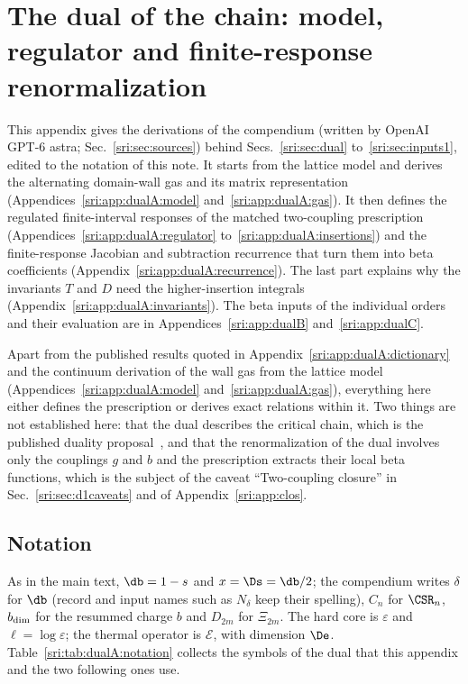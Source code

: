 \section{The dual of the chain: model, regulator and finite-response renormalization}\label{sri:app:dualA}
This appendix gives the derivations of the compendium (written by OpenAI GPT-6 astra; Sec.~\ref{sri:sec:sources})
behind Secs.~\ref{sri:sec:dual} to~\ref{sri:sec:inputs1}, edited to the notation of this note. It starts from the lattice
model and derives the alternating domain-wall gas and its matrix representation
(Appendices~\ref{sri:app:dualA:model} and~\ref{sri:app:dualA:gas}). It then defines the regulated finite-interval responses
of the matched two-coupling prescription (Appendices~\ref{sri:app:dualA:regulator} to~\ref{sri:app:dualA:insertions}) and
the finite-response Jacobian and subtraction recurrence that turn them into beta coefficients
(Appendix~\ref{sri:app:dualA:recurrence}). The last part explains why the invariants $T$ and $D$ need the
higher-insertion integrals (Appendix~\ref{sri:app:dualA:invariants}). The beta inputs of the individual orders and their
evaluation are in Appendices~\ref{sri:app:dualB} and~\ref{sri:app:dualC}.

Apart from the published results quoted in Appendix~\ref{sri:app:dualA:dictionary} and the continuum derivation of the
wall gas from the lattice model (Appendices~\ref{sri:app:dualA:model} and~\ref{sri:app:dualA:gas}), everything here either
defines the prescription or derives exact relations within it. Two things are not established here: that the dual
describes the critical chain, which is the published duality proposal~\cite{sri:Benedetti:2024wgx,sri:Benedetti:2025nzp}, and
that the renormalization of the dual involves only the couplings $g$ and $b$ and the prescription extracts their local
beta functions, which is the subject of the caveat ``Two-coupling closure'' in Sec.~\ref{sri:sec:d1caveats} and of
Appendix~\ref{sri:app:clos}.

\subsection{Notation}\label{sri:app:dualA:notation}
As in the main text, $\db=1-s$ and $x=\Ds=\db/2$; the compendium writes $\delta$ for $\db$ (record and input names
such as $N_\delta$ keep their spelling), $C_n$ for $\CSR_n$, $b_{\rm dim}$ for the resummed charge $b$ and
$D_{2m}$ for $\Xi_{2m}$. The hard core is $\varepsilon$ and
$\ell=\log\varepsilon$; the thermal operator is $\mathcal E$, with dimension $\De$. Table~\ref{sri:tab:dualA:notation}
collects the symbols of the dual that this appendix and the two following ones use.

